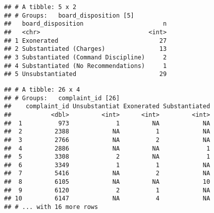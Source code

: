 \documentclass[
]{article}
\newenvironment{Shaded}{\begin{snugshade}}{\end{snugshade}}
\newcommand{\CommentTok}[1]{\textcolor[rgb]{0.56,0.35,0.01}{\textit{#1}}}
\newcommand{\DataTypeTok}[1]{\textcolor[rgb]{0.13,0.29,0.53}{#1}}
\newcommand{\KeywordTok}[1]{\textcolor[rgb]{0.13,0.29,0.53}{\textbf{#1}}}
\newcommand{\NormalTok}[1]{#1}
\newcommand{\OperatorTok}[1]{\textcolor[rgb]{0.81,0.36,0.00}{\textbf{#1}}}
\newcommand{\StringTok}[1]{\textcolor[rgb]{0.31,0.60,0.02}{#1}}
\begin{document}
\begin{verbatim}
## # A tibble: 5 x 2
## # Groups:   board_disposition [5]
##   board_disposition                      n
##   <chr>                              <int>
## 1 Exonerated                            27
## 2 Substantiated (Charges)               13
## 3 Substantiated (Command Discipline)     2
## 4 Substantiated (No Recommendations)     1
## 5 Unsubstantiated                       29
\end{verbatim}

\begin{Shaded}
\end{Shaded}

\begin{verbatim}
## # A tibble: 26 x 4
## # Groups:   complaint_id [26]
##    complaint_id Unsubstantiat Exonerated Substantiated
##           <dbl>         <int>      <int>         <int>
##  1          973             1         NA            NA
##  2         2388            NA          1            NA
##  3         2766            NA          2            NA
##  4         2886            NA         NA             1
##  5         3308             2         NA             1
##  6         3349             1          1            NA
##  7         5416            NA          2            NA
##  8         6105            NA         NA            10
##  9         6120             2          1            NA
## 10         6147            NA          4            NA
## # ... with 16 more rows
\end{verbatim}
\end{document}
